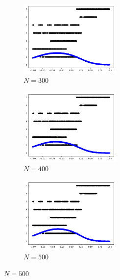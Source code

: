 \documentclass[12pt,letterpaper]{article}
\begin{document}
\begin{enumerate}[leftmargin=!,labelindent=5pt]
\begin{figure}[H]
        \begin{subfigure}{0.3\textwidth}
        \includegraphics[width=5cm]{images/log300.jpg} 
        \caption{$N = 300$}
        \label{fig:subim4}
        \end{subfigure}
        \begin{subfigure}{0.3\textwidth}
        \includegraphics[width=5cm]{images/log400.jpg}
        \caption{$N = 400$}
        \label{fig:subim5}
        \end{subfigure}
        \begin{subfigure}{0.3\textwidth}
        \includegraphics[width=5cm]{images/log500.jpg}
        \caption{$N =500$}
        \label{fig:subim6}
        \end{subfigure}
        

\end{figure}
\end{enumerate}
\end{document}
